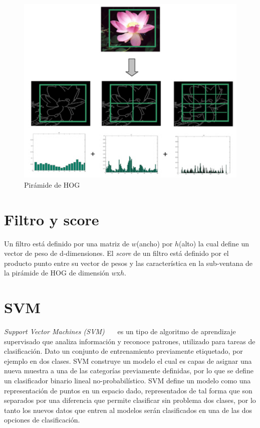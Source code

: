 \begin{figure}[tb]
  \centering
   \includegraphics[width=1\textwidth]{Figuras/phog.jpg}
   \caption{Pirámide de HOG~\cite{pyra}}
   \label{fig:hog_pyra}
\end{figure}

\section{Filtro y score}\label{sec:fas}

Un filtro está definido por una matriz de $w$(ancho) por $h$(alto) la cual define un vector de peso de d-dimensiones. El \textit{score} de un filtro está definido por el producto punto entre su vector de pesos y las característica en la sub-ventana de la pirámide de HOG de dimensión $w$x$h$.
\section{SVM}\label{sec:lsvm}

\textit{Support Vector Machines (SVM)}~\cite{Vapnik1995}~\cite{Duda2000}~\cite{Cortes1995} es un tipo de algoritmo de aprendizaje supervisado que analiza información y reconoce patrones, utilizado para tareas de clasificación. Dato un conjunto de entrenamiento previamente etiquetado, por ejemplo en dos clases. SVM construye un modelo el cual es capas de asignar una nueva muestra a una de las categorías previamente definidas, por lo que se define un clasificador binario lineal no-probabilístico.
SVM define un modelo como una representación de puntos en un espacio dado, representados de tal forma que son separados por una diferencia que permite clasificar sin problema dos clases, por lo tanto los nuevos datos que entren al modelos serán clasificados en una de las dos opciones de clasificación.

